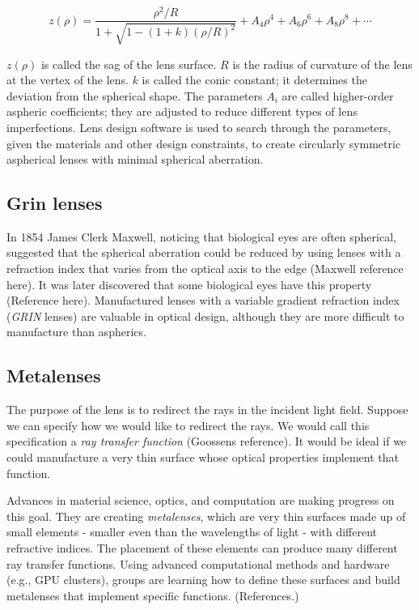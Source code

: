 \documentclass[
  letterpaper,
]{book}
\begin{document}
\begin{equation*}
z(\rho) = \frac{\rho^2 / R}{1 + \sqrt{1 - (1 + k)(\rho/R)^2}} + A_4 \rho^4 + A_6 \rho^6 + A_8 \rho^8 + \cdots
\end{equation*}

\(z(\rho)\) is called the sag of the lens surface. \(R\) is the radius
of curvature of the lens at the vertex of the lens. \(k\) is called the
conic constant; it determines the deviation from the spherical shape.
The parameters \(A_i\) are called higher-order aspheric coefficients;
they are adjusted to reduce different types of lens imperfections. Lens
design software is used to search through the parameters, given the
materials and other design constraints, to create circularly symmetric
aspherical lenses with minimal spherical aberration.

\subsection{Grin lenses}\label{grin-lenses}

In 1854 James Clerk Maxwell, noticing that biological eyes are often
spherical, suggested that the spherical aberration could be reduced by
using lenses with a refraction index that varies from the optical axis
to the edge (Maxwell reference here). It was later discovered that some
biological eyes have this property (Reference here). Manufactured lenses
with a variable gradient refraction index (\emph{GRIN} lenses) are
valuable in optical design, although they are more difficult to
manufacture than aspherics.

\subsection{Metalenses}\label{metalenses}

The purpose of the lens is to redirect the rays in the incident light
field. Suppose we can specify how we would like to redirect the rays. We
would call this specification a \emph{ray transfer function} (Goossens
reference). It would be ideal if we could manufacture a very thin
surface whose optical properties implement that function.

Advances in material science, optics, and computation are making
progress on this goal. They are creating \emph{metalenses}, which are
very thin surfaces made up of small elements - smaller even than the
wavelengths of light - with different refractive indices. The placement
of these elements can produce many different ray transfer functions.
Using advanced computational methods and hardware (e.g., GPU clusters),
groups are learning how to define these surfaces and build metalenses
that implement specific functions. (References.)
\end{document}
